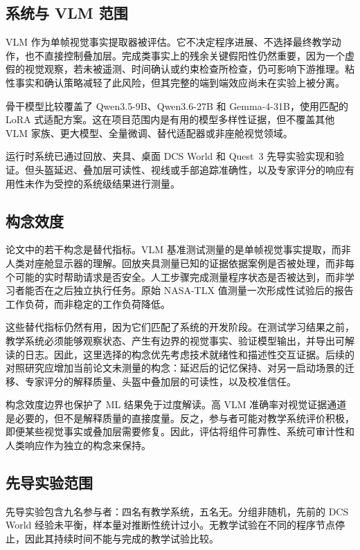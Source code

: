 \subsection{系统与 VLM 范围}

VLM 作为单帧视觉事实提取器被评估。它不决定程序进展、不选择最终教学动作，也不直接控制叠加层。完成类事实上的残余关键假阳性仍然重要，因为一个虚假的视觉观察，若未被遥测、时间确认或约束检查所检查，仍可影响下游推理。粘性事实和确认策略减轻了此风险，但其完整的端到端效应尚未在实验上被分离。

骨干模型比较覆盖了 Qwen3.5-9B、Qwen3.6-27B 和 Gemma-4-31B，使用匹配的 LoRA 式适配方案。这在项目范围内是有用的模型多样性证据，但不覆盖其他 VLM 家族、更大模型、全量微调、替代适配器或非座舱视觉领域。

运行时系统已通过回放、夹具、桌面 DCS World 和 Quest~3 先导实验实现和验证。但头盔延迟、叠加层可读性、视线或手部追踪准确性，以及专家评分的响应有用性未作为受控的系统级结果进行测量。

\subsection{构念效度}

论文中的若干构念是替代指标。VLM 基准测试测量的是单帧视觉事实提取，而非人类对座舱显示器的理解。回放夹具测量已知的证据依据案例是否被处理，而非每个可能的实时帮助请求是否安全。人工步骤完成测量程序状态是否被达到，而非学习者能否在之后独立执行任务。原始 NASA-TLX 值测量一次形成性试验后的报告工作负荷，而非稳定的工作负荷降低。

这些替代指标仍然有用，因为它们匹配了系统的开发阶段。在测试学习结果之前，教学系统必须能够观察状态、产生有边界的视觉事实、验证模型输出，并导出可解读的日志。因此，这里选择的构念优先考虑技术就绪性和描述性交互证据。后续的对照研究应增加当前论文未测量的构念：延迟后的记忆保持、对另一启动场景的迁移、专家评分的解释质量、头盔中叠加层的可读性，以及校准信任。

构念效度边界也保护了 ML 结果免于过度解读。高 VLM 准确率对视觉证据通道是必要的，但不是解释质量的直接度量。反之，参与者可能对教学系统评价积极，即便某些视觉事实或叠加层需要修复。因此，评估将组件可靠性、系统可审计性和人类响应作为独立的构念来保持。

\subsection{先导实验范围}

先导实验包含九名参与者：四名有教学系统，五名无。分组非随机，先前的 DCS World 经验未平衡，样本量对推断性统计过小。无教学试验在不同的程序节点停止，因此其持续时间不能与完成的教学试验比较。

